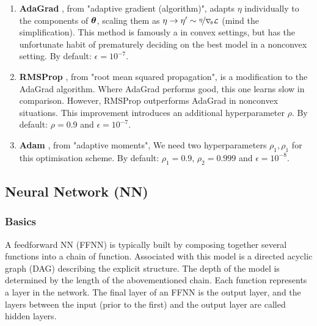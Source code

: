     \begin{enumerate}[leftmargin=0pt,labelwidth=!,labelsep=.05em]
        \item[]\textbf{AdaGrad} \citep[algorithm 8.4]{Goodfellow2016}, from "adaptive gradient (algorithm)", adapts $\eta$ individually to the components of $\boldsymbol{\theta}$, scaling them as $\eta \to \eta' \sim \nicefrac{\eta}{\nabla_{\! \theta} \mathcal{L}}$ (mind the simplification). This method is famously a  in convex settings, but has the unfortunate habit of prematurely deciding on the best model in a nonconvex setting. By default: $\epsilon=10^{-7}$.
        \item[]\textbf{RMSProp} \citep[algorithm 8.5]{Goodfellow2016}, from "root mean squared propagation", is a modification to the AdaGrad algorithm. Where AdaGrad performs good, this one learns slow in comparison. However, RMSProp outperforms AdaGrad in nonconvex situations. This improvement introduces an additional hyperparameter $\rho$. By default: $\rho = 0.9$ and $\epsilon=10^{-7}$.
        \item[]\textbf{Adam} \citep[algorithm 8.7]{Goodfellow2016}, from "adaptive moments", \fillertext We need two hyperparameters $\rho_1, \rho_1$ for this optimisation scheme. By default: $\rho_1 = 0.9$, $\rho_2=0.999$ and $\epsilon=10^{-8}$.
    \end{enumerate}

    
    
\subsection{Neural Network (NN)}\label{sec:neural_network}

    \subsubsection{Basics}\label{sec:basics}

    A feedforward NN (FFNN) is typically built by composing together several functions into a chain of function. Associated with this model is a directed acyclic graph (DAG) describing the explicit structure. The depth of the model is determined by the length of the abovementioned chain. Each function represents a layer in the network. The final layer of an FFNN is the output layer, and the layers between the input (prior to the first) and the output layer are called hidden layers. \citep{Goodfellow2016}

